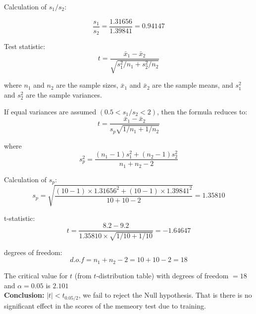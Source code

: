 \documentclass[a4paper,11pt,openright]{report}
\begin{document}
\begin{enumerate}
Calculation of $s_{1}/s_{2}$:

\begin{equation*}
\frac{s_{1}}{s_{2}} = \frac{1.31656}{1.39841} = 0.94147
\end{equation*}

Test statistic: 
\begin{equation*}
t = \frac{\bar x_{1} - \bar x_{2}}{\sqrt{s_{1}^{2}/n_{1} + s_{2}^{2}/n_{2}}}
\end{equation*}

where $n_{1}$ and $n_{2}$ are the sample sizes, $\bar x_{1}$ and $\bar x_{2}$ are the sample
means, and $s_{1}^{2}$ and $s_{2}^{2}$ are the sample variances. 

If equal variances are assumed $(0.5 < s_{1}/s_{2} < 2)$, then the formula reduces to:
\begin{equation*}
t = \frac{\bar x_{1} - \bar x_{2}}{s_{p} \sqrt{1/n_{1} + 1/n_{2}}}
\end{equation*}

where
\begin{equation*}
s_{p}^{2} = \frac{(n_{1}-1)s_{1}^{2} + (n_{2}-1)s_{2}^{2}}{n_{1}+n_{2}-2}
\end{equation*}

\vspace{0.5cm}

Calculation of $s_{p}$:
\begin{equation*}
s_{p} = \sqrt{\frac{(10-1) \times 1.31656^{2} + (10-1) \times 1.39841^{2}}{10+10-2}} 
      = 1.35810
\end{equation*}

\vspace{0.5cm}

t-statistic:
\begin{equation*}
t = \frac{8.2 - 9.2}{1.35810 \times \sqrt{1/10 + 1/10}} = -1.64647
\end{equation*}

degrees of freedom:
\begin{equation*}
d.o.f = n_{1} + n_{2} - 2 = 10 + 10 - 2 = 18
\end{equation*}

The critical value for $t$ (from $t$-distribution table) with degrees of freedom $= 18$ and 
$\alpha = 0.05$ is $2.101$ \\

\textbf{Conclusion:} $|t| < t_{0.05/2}$, we fail to reject the Null hypothesis. That is 
there is no significant effect in the scores of the memeory test due to training. \\
 

\end{enumerate}
\end{document}
